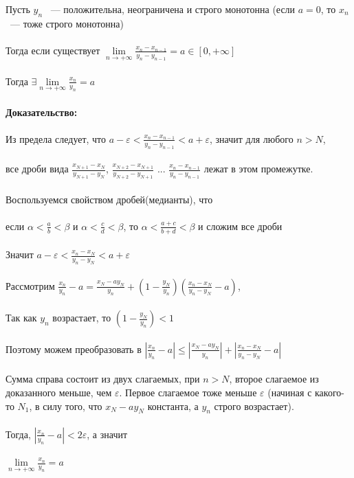 \documentclass[../main.tex]{subfiles}
\begin{document}
Пусть $y_n$ ~--- положительна, неограничена и строго монотонна (если $a = 0$, то $x_n$ ~--- тоже строго монотонна)\\\\
Тогда если существует $\lim\limits_{n \rightarrow +\infty} \frac{x_n - x_{n - 1}}{y_n - y_{n - 1}} = a \in [0, +\infty]$\\\\
Тогда $\exists \lim\limits_{n \rightarrow +\infty} \frac{x_n}{y_n} = a$\\\\
\textbf{Доказательство:}\\\\
Из предела следует, что $a - \varepsilon < \frac{x_n - x_{n - 1}}{y_n - y_{n - 1}} < a + \varepsilon$, значит для любого $n > N$,\\\\ все дроби вида  $\frac{x_{N+1} - x_{N}}{y_{N+1} - y_{N}}$,  $\frac{x_{N+2} - x_{N+1}}{y_{N+2} - y_{N+1}}$ ... $\frac{x_n - x_{n - 1}}{y_n - y_{n-1}}$ лежат в этом промежутке. \\\\
Воспользуемся свойством дробей(медианты), что\\\\ если $\alpha < \frac{a}{b} < \beta$ и $\alpha < \frac{c}{d} < \beta$, то $\alpha < \frac{a+c}{b+d} < \beta$ и сложим все дроби\\\\
Значит $a - \varepsilon < \frac{x_n -x_N}{y_n - y_N} < a + \varepsilon$\\\\
Рассмотрим $\frac{x_n}{y_n} - a = \frac{x_N - a y_N}{y_n} + (1 - \frac{y_N}{y_n})(\frac{x_n - x_N}{y_n - y_N} - a)$,\\\\
Так как $y_n$ возрастает, то $(1 - \frac{y_N}{y_n}) < 1$ \\\\
Поэтому можем преобразовать в $|\frac{x_n}{y_n} - a| \leq |\frac{x_N - a y_N}{y_n}| + |\frac{x_n - x_N}{y_n - y_N} - a|$\\\\
Сумма справа состоит из двух слагаемых, при $n>N$, второе слагаемое из доказанного меньше, чем $\varepsilon$. Первое слагаемое тоже меньше $\varepsilon$ (начиная с какого-то $N_1$, в силу того, что $x_N - a y_N$ константа, а $y_n$ строго возрастает). \\\\
Тогда, $|\frac{x_n}{y_n} - a| < 2 \varepsilon$, а значит \\\\
$\lim\limits_{n \rightarrow +\infty} \frac{x_n}{y_n} = a$
\end{document}
